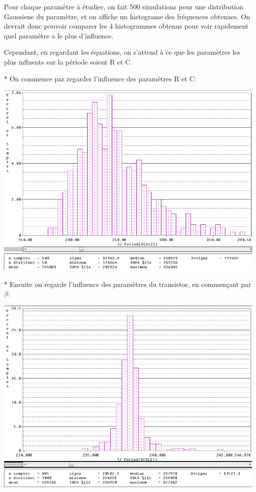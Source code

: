 Pour chaque paramètre à étudier, on fait 500 simulations pour une distribution Gaussiene du paramètre, et on affiche un histograme des fréquences obtenues.
On devrait donc pouvoir comparer les 4 histogrammes obtenus pour voir rapidement quel paramètre a le plus d’influence.

Cependant, en regardant les équations, on s’attend à ce que les paramètres les plus influents sur la période soient R et C.

* On commence par regarder l’influence des paramètres R et C:

\includegraphics[width=\linewidth]{../img/montecarlo_R_C.png}


* Ensuite on regarde l’influence des paramètres du transistor, en commençant par $\beta$:

\includegraphics[width=\linewidth]{../img/montecarlo_beta.png}


